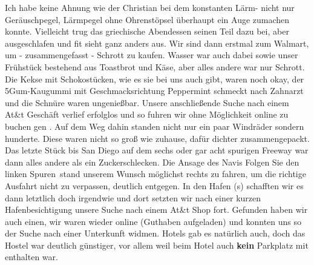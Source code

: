 Ich habe keine Ahnung wie der Christian bei dem konstanten Lärm- nicht nur Geräuschpegel, Lärmpegel ohne Ohrenstöpsel überhaupt ein Auge zumachen konnte.
Vielleicht trug das griechische Abendessen seinen Teil dazu bei, aber ausgeschlafen und fit sieht ganz anders aus.
Wir sind dann erstmal zum Walmart, um - zusammengefasst - Schrott zu kaufen.
Wasser war auch dabei sowie unser Frühstück bestehend aus Toastbrot und Käse, aber alles andere war nur Schrott.
Die Kekse mit Schokostücken, wie es sie bei uns auch gibt, waren noch okay, der 5Gum-Kaugummi mit Geschmacksrichtung Peppermint schmeckt nach Zahnarzt und die Schnüre waren ungenießbar.
Unsere anschließende Suche nach einem At\&t Geschäft verlief erfolglos und so fuhren wir ohne Möglichkeit online zu buchen gen .
Auf dem Weg dahin standen nicht nur ein paar Windräder sondern hunderte.
Diese waren nicht so groß wie zuhause, dafür dichter zusammengepackt.\\


Das letzte Stück bis San Diego auf dem sechs oder gar acht spurigen Freeway war dann alles andere als ein Zuckerschlecken.
Die Ansage des Navis \flqq Folgen Sie den linken Spuren\frqq \, stand unserem Wunsch möglichst rechts zu fahren, um die richtige Ausfahrt nicht zu verpassen, deutlich entgegen.
In den Hafen (s) schafften wir es dann letztlich doch irgendwie und dort setzten wir nach einer kurzen Hafenbesichtigung unsere Suche nach einem At\&t Shop fort.
Gefunden haben wir auch einen, wir waren wieder online (Guthaben aufgeladen) und konnten uns so der Suche nach einer Unterkunft widmen.
Hotels gab es natürlich auch, doch das Hostel war deutlich günstiger, vor allem weil beim Hotel auch \textbf{kein} Parkplatz mit enthalten war.


